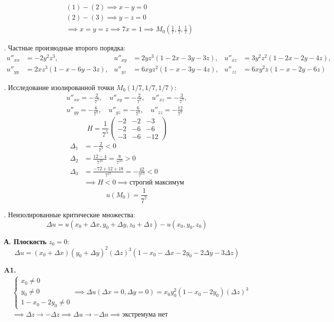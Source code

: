 \documentclass[12pt]{article}
\begin{document}
\begin{align*}
&(1)-(2) \implies x - y = 0 \\
&(2)-(3) \implies y - z = 0 \\
&\implies x = y = z \implies 7x = 1 \implies M_0 \left( \frac{1}{7}, \frac{1}{7}, \frac{1}{7} \right)
\end{align*}

. Частные производные второго порядка:
\begin{align*}
u''_{xx} &= -2y^2z^3, & u''_{xy} &= 2yz^3(1-2x-3y-3z), & u''_{xz} &= 3y^2z^2(1-2x-2y-4z), \\
u''_{yy} &= 2xz^3(1-x-6y-3z), & u''_{yz} &= 6xyz^2(1-x-3y-4z), & u''_{zz} &= 6xy^2z(1-x-2y-6z)
\end{align*}

. Исследование изолированной точки \(M_0(1/7, 1/7, 1/7)\):
\begin{gather*}
u''_{xx} = -\frac{2}{7^5}, \quad u''_{xy} = -\frac{2}{7^5}, \quad u''_{xz} = -\frac{3}{7^5}, \\
u''_{yy} = -\frac{6}{7^5}, \quad u''_{yz} = -\frac{6}{7^5}, \quad u''_{zz} = -\frac{12}{7^5}
\end{gather*}
\[
H = \frac{1}{7^5} \begin{pmatrix} -2 & -2 & -3 \\ -2 & -6 & -6 \\ -3 & -6 & -12 \end{pmatrix}
\]
\begin{align*}
\Delta_1 &= -\frac{2}{7^5} < 0 \\
\Delta_2 &= \frac{12-4}{7^{10}} = \frac{8}{7^{10}} > 0 \\
\Delta_3 &= \frac{-72+12+18}{7^{15}} = -\frac{42}{7^{15}} < 0 \\
&\implies H < 0 \implies \text{строгий максимум}
\end{align*}
\[
u(M_0) = \frac{1}{7^7}
\]

. Неизолированные критические множества:
\[
\Delta u = u(x_0 + \Delta x, y_0 + \Delta y, z_0 + \Delta z) - u(x_0, y_0, z_0)
\]

\noindent \textbf{А. Плоскость } \(z_0 = 0\):
\[
\Delta u = (x_0+\Delta x)(y_0+\Delta y)^2 (\Delta z)^3 (1 - x_0 - \Delta x - 2y_0 - 2\Delta y - 3\Delta z)
\]

\noindent \textbf{A1.}
\begin{align*}
&\begin{cases} x_0 \neq 0 \\ y_0 \neq 0 \\ 1 - x_0 - 2y_0 \neq 0 \end{cases} \implies \Delta u(\Delta x=0, \Delta y=0) = x_0 y_0^2 (1 - x_0 - 2y_0) (\Delta z)^3 \\
&\implies \Delta z \to -\Delta z \implies \Delta u \to -\Delta u \implies \text{экстремума нет}
\end{align*}
\end{document}
